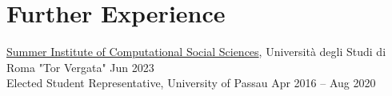 \documentclass{article}
\renewenvironment{itemize}[1]{\begin{compactitem}#1}{\end{compactitem}}
\begin{document}
\section{Further Experience}
\vspace{.5em}

\ralewaysb \href{https://sicss.io/2023/roma-tor-vergata/people}{Summer Institute of Computational Social Sciences}, \raleway Università degli Studi di Roma "Tor Vergata" \hfill Jun 2023\\
\ralewaysb Elected Student Representative, \raleway University of Passau \hfill Apr 2016 – Aug 2020






\end{document}
